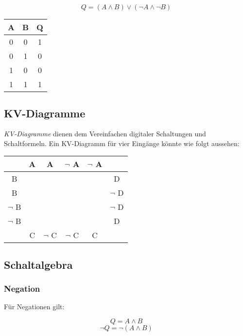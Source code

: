 \documentclass[a4paper, 12pt]{report}
\begin{document}
\begin{center}
	\begin{equation}
		Q = (A \land B) \lor (\neg A \land \neg B)
	\end{equation}
   \begin{tabular}{ | c | c || c | }
    	\hline
    	A & B & Q \\ \hline
    	0 & 0 & 1 \\ \hline
    	0 & 1 & 0 \\ \hline
    	1 & 0 & 0 \\ \hline
    	1 & 1 & 1 \\
    	\hline
    \end{tabular}
\end{center}

\subsection{KV-Diagramme}

\emph{KV-Diagramme} dienen dem Vereinfachen digitaler Schaltungen und
Schaltformeln. Ein KV-Diagramm für vier Eingänge könnte wie folgt aussehen:

\begin{center}
    \begin{tabular}{ | c | c | c | c | c | c | }
	\hline
	 & A & A & $\neg$ A & $\neg$ A &  \\ \hline
	B & & & & & D \\ \hline
	B & & & & & $\neg$ D \\ \hline
	$\neg$ B & & & & & $\neg$ D \\ \hline
	$\neg$ B & & & & & D \\ \hline
	 & C & $\neg$ C & $\neg$ C & C &  \\
	\hline
    \end{tabular}
\end{center}


\newpage
\subsection{Schaltalgebra}

\subsubsection{Negation}

Für Negationen gilt:

\begin{center}
    \begin{equation}
	Q = A \land B
    \end{equation}
    \begin{equation}
	\neg Q = \neg (A \land B)
    \end{equation}
\end{center}
\end{document}
